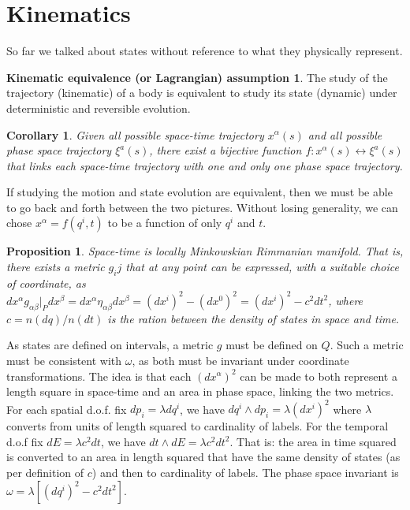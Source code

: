 \documentclass[aps,pra,10pt,twocolumn,floatfix,nofootinbib]{revtex4-1}
\newtheorem{cor}[thm]{Corollary}
\newtheorem{prop}[thm]{Proposition}
\theoremstyle{definition}
\newtheorem*{assump3}{Kinematic equivalence (or Lagrangian) assumption}
\begin{document}
\section{Kinematics}
So far we talked about states without reference to what they physically represent.

\begin{assump3}\label{kinematicAssumption}
The study of the trajectory (kinematic) of a body is equivalent to study its state (dynamic) under deterministic and reversible evolution.
\end{assump3}

\begin{cor}\label{}
Given all possible space-time trajectory $x^\alpha(s)$ and all possible phase space trajectory $\xi^a(s)$, there exist a bijective function $f: x^\alpha(s) \leftrightarrow \xi^a(s)$ that links each space-time trajectory with one and only one phase space trajectory.
\end{cor}

If studying the motion and state evolution are equivalent, then we must be able to go back and forth between the two pictures. Without losing generality, we can chose $x^\alpha=f(q^i,t)$ to be a function of only $q^i$ and $t$.

\begin{prop}\label{locallyMinkowski}
Space-time is locally Minkowskian Rimmanian manifold. That is, there exists a metric $g_ij$ that at any point can be expressed, with a suitable choice of coordinate, as $dx^\alpha g_{\alpha \beta}|_P dx^\beta=dx^\alpha\eta_{\alpha \beta}dx^\beta=(dx^i)^2 - (dx^0)^2=(dx^i)^2 - c^2dt^2$, where $c=n(dq)/n(dt)$ is the ration between the density of states in space and time.
\end{prop}

As states are defined on intervals, a metric $g$ must be defined on $Q$. Such a metric must be consistent with $\omega$, as both must be invariant under coordinate transformations. The idea is that each $(dx^\alpha)^2$ can be made to both represent a length square in space-time and an area in phase space, linking the two metrics. For each spatial d.o.f. fix $dp_i=\lambda dq^i$, we have $dq^i \wedge dp_i = \lambda (dx^i)^2$ where $\lambda$ converts from units of length squared to cardinality of labels. For the temporal d.o.f fix $dE = \lambda c^2 dt$, we have $dt \wedge dE = \lambda c^2 dt^2$. That is: the area in time squared is converted to an area in length squared that have the same density of states (as per definition of $c$) and then to cardinality of labels. The phase space invariant is $\omega = \lambda [(dq^i)^2 - c^2 dt^2]$.
\end{document}
